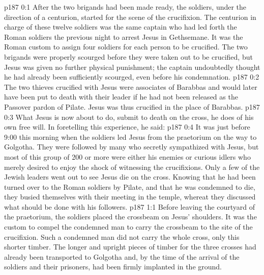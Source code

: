 \author{Midwayer Commission}
\vs p187 0:1 After the two brigands had been made ready, the soldiers, under the direction of a centurion, started for the scene of the crucifixion. The centurion in charge of these twelve soldiers was the same captain who had led forth the Roman soldiers the previous night to arrest Jesus in Gethsemane. It was the Roman custom to assign four soldiers for each person to be crucified. The two brigands were properly scourged before they were taken out to be crucified, but Jesus was given no further physical punishment; the captain undoubtedly thought he had already been sufficiently scourged, even before his condemnation.
\vs p187 0:2 The two thieves crucified with Jesus were associates of Barabbas and would later have been put to death with their leader if he had not been released as the Passover pardon of Pilate. Jesus was thus crucified in the place of Barabbas.
\vs p187 0:3 What Jesus is now about to do, submit to death on the cross, he does of his own free will. In foretelling this experience, he said: 
\vs p187 0:4 It was just before 9:00 this morning when the soldiers led Jesus from the praetorium on the way to Golgotha. They were followed by many who secretly sympathized with Jesus, but most of this group of 200 or more were either his enemies or curious idlers who merely desired to enjoy the shock of witnessing the crucifixions. Only a few of the Jewish leaders went out to see Jesus die on the cross. Knowing that he had been turned over to the Roman soldiers by Pilate, and that he was condemned to die, they busied themselves with their meeting in the temple, whereat they discussed what should be done with his followers.
\vs p187 1:1 Before leaving the courtyard of the praetorium, the soldiers placed the crossbeam on Jesus’ shoulders. It was the custom to compel the condemned man to carry the crossbeam to the site of the crucifixion. Such a condemned man did not carry the whole cross, only this shorter timber. The longer and upright pieces of timber for the three crosses had already been transported to Golgotha and, by the time of the arrival of the soldiers and their prisoners, had been firmly implanted in the ground.
